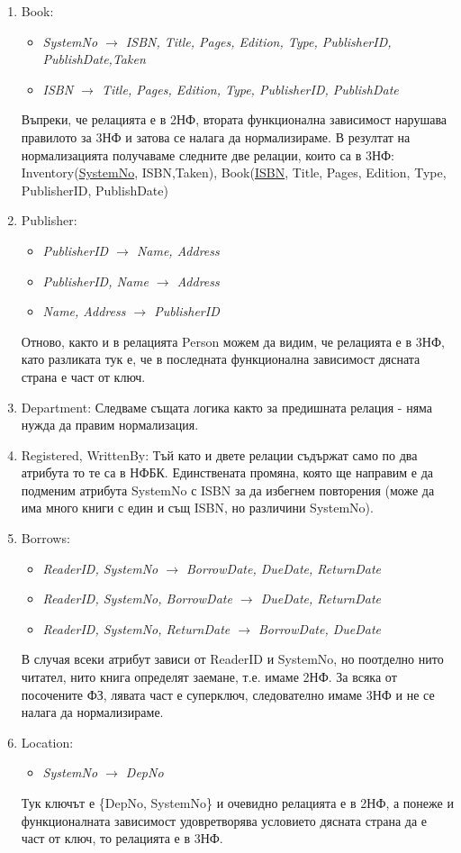 \documentclass[11pt,a4paper]{article}
\begin{document}
\begin{enumerate}
\item Book:
\begin{itemize}
\item \textit{SystemNo $\rightarrow$ ISBN, Title, Pages, Edition, Type, PublisherID, PublishDate,Taken}
\item \textit{ISBN $\rightarrow$ Title, Pages, Edition, Type, PublisherID, PublishDate}
\end{itemize}
Въпреки, че релацията е в 2НФ, втората функционална зависимост нарушава правилото за 3НФ и затова се налага да нормализираме. В резултат на нормализацията получаваме следните две релации, които са в 3НФ:\\
Inventory(\underline{SystemNo}, ISBN,Taken),
Book(\underline{ISBN}, Title, Pages, Edition, Type, PublisherID, PublishDate)

\item Publisher:
\begin{itemize}
\item \textit{PublisherID $\rightarrow$ Name, Address}
\item \textit{PublisherID, Name $\rightarrow$ Address}
\item \textit{Name, Address $\rightarrow$ PublisherID}
\end{itemize}
Отново, както и в релацията Person можем да видим, че релацията е в 3НФ, като разликата тук е, че в последната функционална зависимост дясната страна е част от ключ.

\item Department:
Следваме същата логика както за предишната релация - няма нужда да правим нормализация.

\item Registered, WrittenBy:
Тъй като и двете релации съдържат само по два атрибута то те са в НФБК. Единствената промяна, която ще направим е да подменим атрибута SystemNo с ISBN за да избегнем повторения (може да има много книги с един и същ ISBN, но различини SystemNo).

\item Borrows:
\begin{itemize}
\item \textit{ReaderID, SystemNo $\rightarrow$ BorrowDate, DueDate, ReturnDate}
\item \textit{ReaderID, SystemNo, BorrowDate $\rightarrow$ DueDate, ReturnDate}
\item \textit {ReaderID, SystemNo, ReturnDate $\rightarrow$ BorrowDate, DueDate}
\end{itemize}
В случая всеки атрибут зависи от ReaderID и SystemNo, но поотделно нито читател, нито книга определят заемане, т.е. имаме 2НФ. За всяка от посочените ФЗ, лявата част е суперключ, следователно имаме 3НФ и не се налага да нормализираме.
\item Location:
\begin{itemize}
\item \textit { SystemNo $\rightarrow$ DepNo}
\end{itemize}
Тук ключът е \{DepNo, SystemNo\} и очевидно релацията е в 2НФ, а понеже и функционалната зависимост удовретворява условието дясната страна да е част от ключ, то релацията е в 3НФ.
\end{enumerate} 
\end{document}
